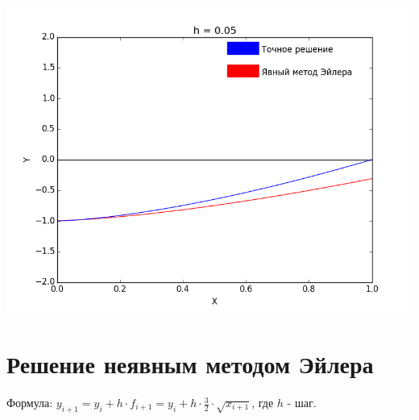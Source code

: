 \documentclass[12pt,a4paper]{article}
\begin{document}
        \includegraphics[scale=0.45]{explicitEulerGraph_Step=0_05}
        
    \section*{Решение неявным методом Эйлера}
        Формула: $y_{i+1} = y_{i} + h \cdot f_{i+1} = y_{i} + h \cdot \frac{3}{2} \cdot
        \sqrt{x_{i+1}}$, где $h$ - шаг.\\
        
\end{document}
